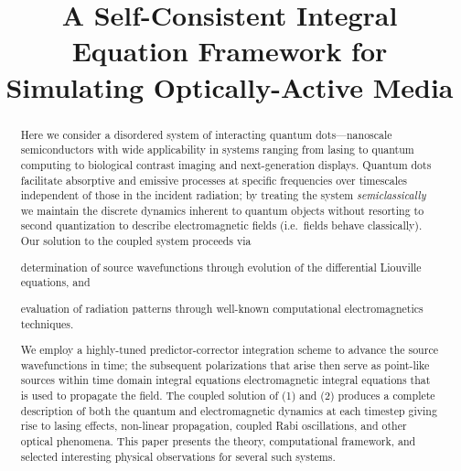 \documentclass[conference]{IEEEtran}
\begin{document}
\title{A Self-Consistent Integral Equation Framework for Simulating Optically-Active Media}



\maketitle

\begin{abstract}
Here we consider a disordered system of interacting quantum dots---nanoscale semiconductors with wide applicability in systems ranging from lasing to quantum computing to biological contrast imaging and next-generation displays.
Quantum dots facilitate absorptive and emissive processes at specific frequencies over timescales independent of those in the incident radiation; by treating the system \emph{semiclassically} we maintain the discrete dynamics inherent to quantum objects without resorting to second quantization to describe electromagnetic fields (i.e.\ fields behave classically).
Our solution to the coupled system proceeds via
  \begin{inparaenum}[(1)]
  \item determination of source wavefunctions through evolution of the differential Liouville equations, and \label{enum:step 1}
  \item evaluation of radiation patterns through well-known computational electromagnetics techniques. \label{enum:step 2}
  \end{inparaenum}
We employ a highly-tuned predictor-corrector integration scheme to advance the source wavefunctions in time; the subsequent polarizations that arise then serve as point-like sources within time domain integral equations electromagnetic integral equations that is used to propagate the field.
The coupled solution of (1) and (2) produces a complete description of both the quantum and electromagnetic dynamics at each timestep giving rise to lasing effects, non-linear propagation, coupled Rabi oscillations, and other optical phenomena.
This paper presents the theory, computational framework, and selected interesting physical observations for several such systems.
\end{abstract}
\end{document}
